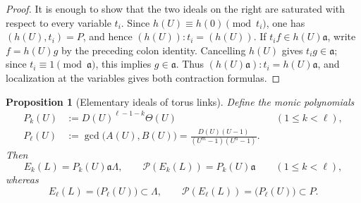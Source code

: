 \documentclass{article}
\theoremstyle{definition}
\theoremstyle{plain}
\newtheorem{proposition}[definition]{Proposition}
\newcommand{\PP}{\mathcal{P}}
\DeclareMathOperator{\gcdop}{gcd}
\begin{document}
\begin{proof}
It is enough to show that the two ideals on the right are saturated with
respect to every variable \(t_i\).  Since
\(h(U)\equiv h(0)\pmod{t_i}\), one has
\((h(U),t_i)=P\), and hence \((h(U)):t_i=(h(U))\).  If
\(t_i f\in h(U)\mathfrak a\), write \(f=h(U)g\) by the preceding colon
identity.  Cancelling \(h(U)\) gives \(t_i g\in\mathfrak a\); since
\(t_i\equiv1\pmod{\mathfrak a}\), this implies \(g\in\mathfrak a\).
Thus \((h(U)\mathfrak a):t_i=h(U)\mathfrak a\), and localization at the
variables gives both contraction formulas.
\end{proof}

\begin{proposition}[Elementary ideals of torus links]
\label{prop:toruslink-Ek}
Define the monic polynomials
\[
\begin{aligned}
 P_k(U)&:=D(U)^{\ell-1-k}\Theta(U) &&(1\le k<\ell),\\
 P_\ell(U)&:=\gcdop\bigl(A(U),B(U)\bigr)
 =\frac{D(U)(U-1)}{(U^m-1)(U^n-1)}.
\end{aligned}
\]
Then
\[
 E_k(L)=P_k(U)\mathfrak a\Lambda,
 \qquad
 \PP(E_k(L))=P_k(U)\mathfrak a
 \qquad(1\le k<\ell),
\]
whereas
\[
 E_\ell(L)=\bigl(P_\ell(U)\bigr)\subset\Lambda,
 \qquad
 \PP(E_\ell(L))=\bigl(P_\ell(U)\bigr)\subset P.
\]
\end{proposition}
\end{document}
